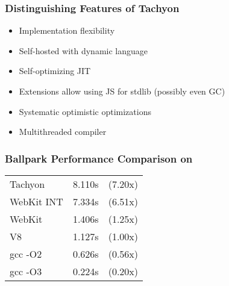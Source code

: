 \begin{frame}
\frametitle{\bf Distinguishing Features of Tachyon}
    \begin{itemize}
        \item Implementation flexibility
        \item Self-hosted with dynamic language
        \item Self-optimizing JIT
        \item Extensions allow using JS for stdlib (possibly even GC)
        \item Systematic optimistic optimizations
        \item Multithreaded compiler
    \end{itemize}
\end{frame}

\begin{frame}
\frametitle{\bf Ballpark Performance Comparison on }

\begin{center}
\begin{tabular}{lll}
Tachyon     & 8.110s & (7.20x) \\
WebKit INT  & 7.334s & (6.51x) \\
WebKit      & 1.406s & (1.25x) \\
V8          & 1.127s & (1.00x) \\
gcc -O2     & 0.626s & (0.56x) \\
gcc -O3     & 0.224s & (0.20x)
\end{tabular}
\end{center}

\end{frame}

